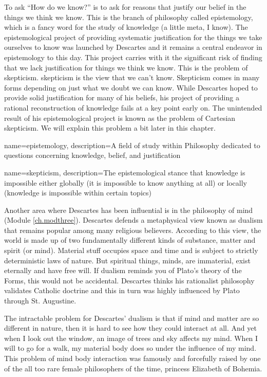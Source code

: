 To ask “How do we know?” is to ask for reasons that justify our belief in the things we think we know. This is the branch of philosophy called \Gls{epistemology}, which is a fancy word for the study of knowledge (a little meta, I know). The epistemological project of providing systematic justification for the things we take ourselves to know was launched by Descartes and it remains a central endeavor in epistemology to this day. This project carries with it the significant risk of finding that we lack justification for things we think we know. This is the problem of skepticism. \Gls{skepticism} is the view that we can’t know. Skepticism comes in many forms depending on just what we doubt we can know. While Descartes hoped to provide solid justification for many of his beliefs, his project of providing a rational reconstruction of knowledge fails at a key point early on. The unintended result of his epistemological project is known as the problem of Cartesian skepticism. We will explain this problem a bit later in this chapter.


{
name=epistemology,
description={A field of study within Philosophy dedicated to questions concerning knowledge, belief, and justification}
}

{
name=skepticism,
description={The epistemological stance that knowledge is impossible either globally (it is impossible to know anything at all) or locally (knowledge is impossible within certain topics)}
}



Another area where Descartes has been influential is in the philosophy of mind (Module \ref{ch.modthree}). Descartes defends a metaphysical view known as dualism that remains popular among many religious believers. According to this view, the world is made up of two fundamentally different kinds of substance, matter and spirit (or mind). Material stuff occupies space and time and is subject to strictly deterministic laws of nature. But spiritual things, minds, are immaterial, exist eternally and have free will. If dualism reminds you of Plato’s theory of the Forms, this would not be accidental. Descartes thinks his rationalist philosophy validates Catholic doctrine and this in turn was highly influenced by Plato through St. Augustine.

The intractable problem for Descartes’ dualism is that if mind and matter are so different in nature, then it is hard to see how they could interact at all. And yet when I look out the window, an image of trees and sky affects my mind. When I will to go for a walk, my material body does so under the influence of my mind. This problem of mind body interaction was famously and forcefully raised by one of the all too rare female philosophers of the time, princess Elizabeth of Bohemia.

